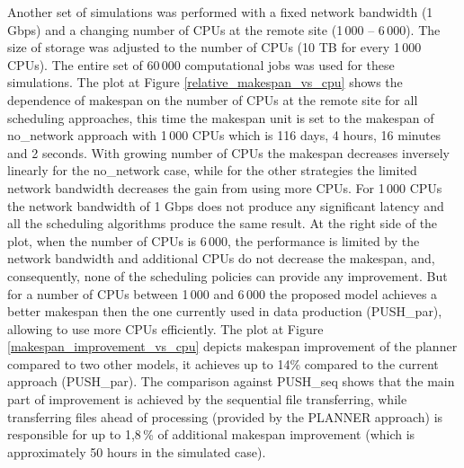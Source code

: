 \documentclass{svjour3}                     %
\begin{document}
Another set of simulations was performed with a fixed network bandwidth (1 Gbps) and a changing number of CPUs at the remote site (1\,000 -- 6\,000). The size of storage was adjusted to the number of CPUs (10 TB for every 1\,000 CPUs). The entire set of 60\,000 computational jobs was used for these simulations. The plot at Figure \ref{relative_makespan_vs_cpu} shows the dependence of makespan on the number of CPUs at the remote site for all scheduling approaches, this time the makespan unit is set to  the makespan of no\_network approach with 1\,000 CPUs which is 116 days, 4 hours, 16 minutes and 2 seconds. With growing number of CPUs the makespan decreases inversely linearly for the no\_network case, while for the other strategies the limited network bandwidth decreases the gain from using more CPUs. For 1\,000 CPUs the network bandwidth of 1 Gbps does not produce any significant latency and all the scheduling algorithms produce the same result. At the right side of the plot, when the number of CPUs is 6\,000, the performance is limited by the network bandwidth and additional CPUs do not decrease the makespan, and, consequently, none of the scheduling policies can provide any improvement. But for a number of CPUs between 1\,000 and 6\,000 the proposed model achieves a better makespan then the one currently used in data production (PUSH\_par), allowing to use more CPUs efficiently. The plot at Figure \ref{makespan_improvement_vs_cpu} depicts makespan improvement of the planner compared to two other models, it achieves up to 14\% compared to the current approach (PUSH\_par). The comparison against PUSH\_seq shows that the main part of improvement is achieved by the sequential file transferring, while transferring files ahead of processing (provided by the PLANNER approach) is responsible for up to 1,8\,\% of additional makespan improvement (which is approximately 50 hours in the simulated case).
\end{document}
